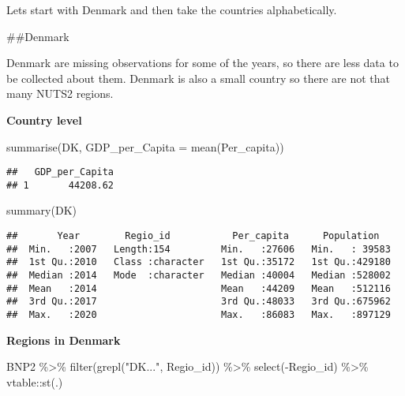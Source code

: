 \documentclass[
]{article}
\newenvironment{Shaded}{\begin{snugshade}}{\end{snugshade}}
\newcommand{\AttributeTok}[1]{\textcolor[rgb]{0.77,0.63,0.00}{#1}}
\newcommand{\FunctionTok}[1]{\textcolor[rgb]{0.00,0.00,0.00}{#1}}
\newcommand{\NormalTok}[1]{#1}
\newcommand{\SpecialCharTok}[1]{\textcolor[rgb]{0.00,0.00,0.00}{#1}}
\newcommand{\StringTok}[1]{\textcolor[rgb]{0.31,0.60,0.02}{#1}}
\begin{document}
Lets start with Denmark and then take the countries alphabetically.

\#\#Denmark

Denmark are missing observations for some of the years, so there are
less data to be collected about them. Denmark is also a small country so
there are not that many NUTS2 regions.

\textbf{Country level}

\begin{Shaded}
\begin{Highlighting}[]
    \FunctionTok{summarise}\NormalTok{(DK, }\AttributeTok{GDP\_per\_Capita =} \FunctionTok{mean}\NormalTok{(Per\_capita))}
\end{Highlighting}
\end{Shaded}

\begin{verbatim}
##   GDP_per_Capita
## 1       44208.62
\end{verbatim}

\begin{Shaded}
\begin{Highlighting}[]
\FunctionTok{summary}\NormalTok{(DK)}
\end{Highlighting}
\end{Shaded}

\begin{verbatim}
##       Year        Regio_id           Per_capita      Population    
##  Min.   :2007   Length:154         Min.   :27606   Min.   : 39583  
##  1st Qu.:2010   Class :character   1st Qu.:35172   1st Qu.:429180  
##  Median :2014   Mode  :character   Median :40004   Median :528002  
##  Mean   :2014                      Mean   :44209   Mean   :512116  
##  3rd Qu.:2017                      3rd Qu.:48033   3rd Qu.:675962  
##  Max.   :2020                      Max.   :86083   Max.   :897129
\end{verbatim}

\textbf{Regions in Denmark}

\begin{Shaded}
\begin{Highlighting}[]
\NormalTok{BNP2 }\SpecialCharTok{\%\textgreater{}\%}
  \FunctionTok{filter}\NormalTok{(}\FunctionTok{grepl}\NormalTok{(}\StringTok{"DK..."}\NormalTok{, Regio\_id)) }\SpecialCharTok{\%\textgreater{}\%}
  \FunctionTok{select}\NormalTok{(}\SpecialCharTok{{-}}\NormalTok{Regio\_id) }\SpecialCharTok{\%\textgreater{}\%}
\NormalTok{  vtable}\SpecialCharTok{::}\FunctionTok{st}\NormalTok{(.)}
\end{Highlighting}
\end{Shaded}
\end{document}
